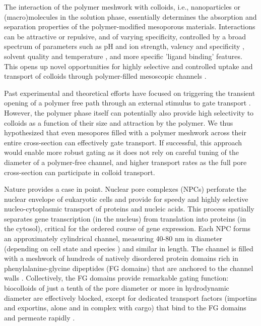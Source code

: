 \documentclass[12pt, a4paper]{article}
\begin{document}
The interaction of the polymer meshwork with colloids, i.e., nanoparticles or (macro)molecules in the solution phase, essentially determines the absorption and separation properties of the polymer-modified mesoporous materials.
Interactions can be attractive or repulsive, and of varying specificity, controlled by a broad spectrum of parameters \cite{Low2019} such as pH and ion strength, valency and specificity \cite{Lee2010}, solvent quality and temperature \cite{Halperin2011, Stetsyshyn2020}, and more specific 'ligand binding' features.
This opens up novel opportunities for highly selective and controlled uptake and transport of colloids through polymer-filled mesoscopic channels \cite{Sirkin2020}.

Past experimental and theoretical efforts have focused on triggering the transient opening of a polymer free path through an external stimulus to gate transport \cite{Alberti2015, Emilsson2018, Caspi2008}.
However, the polymer phase itself can potentially also provide high selectivity to colloids as a function of their size and attraction by the polymer.
We thus hypothesized that even mesopores filled with a polymer meshwork across their entire cross-section can effectively gate transport.
If successful, this approach would enable more robust gating as it does not rely on careful tuning of the diameter of a polymer-free channel, and higher transport rates as the full pore cross-section can participate in colloid transport.

Nature provides a case in point.
Nuclear pore complexes (NPCs) perforate the nuclear envelope of eukaryotic cells and provide for speedy and highly selective nucleo-cytoplasmic transport of proteins and nucleic acids.
This process spatially separates gene transcription (in the nucleus) from translation into proteins (in the cytosol), critical for the ordered course of gene expression.
Each NPC forms an approximately cylindrical channel, measuring 40-80 nm in diameter (depending on cell state and species \cite{Zimmerli2021, Schuller2021}) and similar in length.
The channel is filled with a meshwork of hundreds of natively disordered protein domains rich in phenylalanine-glycine dipeptides (FG domains) that are anchored to the channel walls \cite{Ori2013, Rajoo2018, Kim2018, Zimmerli2021}.
Collectively, the FG domains provide remarkable gating function: biocolloids of just a tenth of the pore diameter or more in hydrodynamic diameter are effectively blocked, except for dedicated transport factors (importins and exportins, alone and in complex with cargo) that bind to the FG domains and permeate rapidly \cite{Hoogenboom2021}. 
\end{document}
